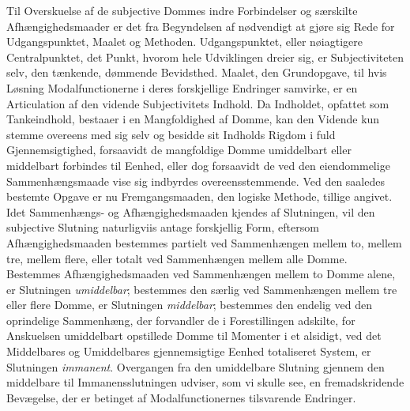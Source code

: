 \documentclass[12pt]{book}
\newcommand{\opage}[1]{\marginnote{\footnotesize\textit{[#1]}}}
\begin{document}
Til Overskuelse af de subjective Dommes indre Forbindelser
og særskilte Afhængighedsmaader er det fra Begyndelsen
af nødvendigt at gjøre sig Rede for Udgangspunktet, Maalet
og Methoden. Udgangspunktet, eller nøiagtigere Centralpunktet,
det Punkt, hvorom hele Udviklingen dreier sig, er
Subjectiviteten selv, den tænkende, dømmende Bevidsthed.
Maalet, den Grundopgave, til hvis Løsning Modalfunctionerne
i deres forskjellige Endringer samvirke, er en Articulation af
den vidende Subjectivitets Indhold. Da Indholdet, opfattet
som Tankeindhold, bestaaer i en Mangfoldighed af Domme,
kan den Vidende kun stemme overeens med sig selv og besidde
sit Indholds Rigdom i fuld Gjennemsigtighed, forsaavidt de
mangfoldige Domme umiddelbart eller middelbart forbindes
til Eenhed, eller dog forsaavidt de ved den eiendommelige
Sammenhængsmaade vise sig indbyrdes overeensstemmende.
Ved den saaledes bestemte Opgave er nu Fremgangsmaaden,
den logiske Methode, tillige angivet. Idet Sammenhængs- og
Afhængighedsmaaden kjendes af Slutningen, vil den subjective
Slutning naturligviis antage forskjellig Form, eftersom
Af\opage{294}hængighedsmaaden bestemmes partielt ved Sammenhængen
mellem to, mellem tre, mellem flere, eller totalt ved Sammenhængen
mellem alle Domme. Bestemmes Afhængighedsmaaden
ved Sammenhængen mellem to Domme alene, er Slutningen
\emph{umiddelbar}; bestemmes den særlig ved Sammenhængen mellem
tre eller flere Domme, er Slutningen \emph{middelbar}; bestemmes
den endelig ved den oprindelige Sammenhæng, der forvandler
de i Forestillingen adskilte, for Anskuelsen umiddelbart opstillede
Domme til Momenter i et alsidigt, ved det Middelbares
og Umiddelbares gjennemsigtige Eenhed totaliseret System,
er Slutningen \emph{immanent}. Overgangen fra den umiddelbare
Slutning gjennem den middelbare til Immanensslutningen
udviser, som vi skulle see, en fremadskridende Bevægelse,
der er betinget af Modalfunctionernes tilsvarende Endringer.
\end{document}
